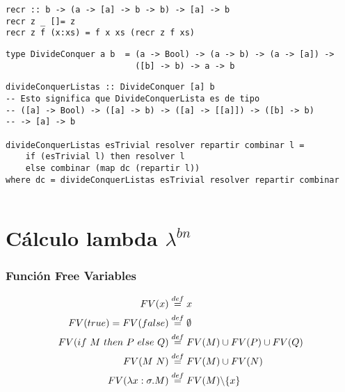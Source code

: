 \documentclass[10pt,a4paper]{article}
\begin{document}
\begin{centrado}
	\begin{verbatim}
recr :: b -> (a -> [a] -> b -> b) -> [a] -> b
recr z _ []= z
recr z f (x:xs) = f x xs (recr z f xs)
	\end{verbatim}
\end{centrado}

\begin{centrado}
	\begin{verbatim}
type DivideConquer a b  = (a -> Bool) -> (a -> b) -> (a -> [a]) -> 
                          ([b] -> b) -> a -> b                         
\end{verbatim}
\end{centrado}
\begin{centrado}
	\begin{verbatim}
divideConquerListas :: DivideConquer [a] b
-- Esto significa que DivideConquerLista es de tipo 
-- ([a] -> Bool) -> ([a] -> b) -> ([a] -> [[a]]) -> ([b] -> b)
-- -> [a] -> b

divideConquerListas esTrivial resolver repartir combinar l =
	if (esTrivial l) then resolver l
	else combinar (map dc (repartir l))
where dc = divideConquerListas esTrivial resolver repartir combinar
                        
	\end{verbatim}
\end{centrado}

\newpage
\section{Cálculo lambda $\lambda^{bn}$}
\subsubsection*{Función Free Variables}
\begin{equation*}
\begin{split}
FV(x) &\overset{def}{=} {x} \\
FV(true) = FV(false) &\overset{def}{=} \emptyset \\
FV(if~ M~ then~ P~ else~ Q) &\overset{def}{=} FV(M)\cup FV(P)\cup FV(Q) \\
FV(M~N) &\overset{def}{=} FV(M)\cup FV(N) \\
FV(\lambda x: \sigma . M) &\overset{def}{=} FV(M) \backslash \{x\}
\end{split}
\end{equation*}
\end{document}
